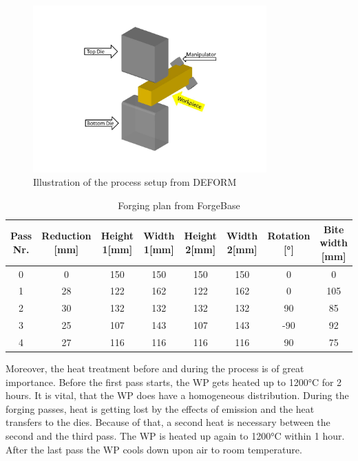 \begin{figure}[!htbp]
 \centering
 \includegraphics[width=0.8\textwidth]{images/processsetup}
 \caption{Illustration of the process setup from DEFORM}
 \label{img:processsetup}
\end{figure}

\begin{table}
 \centering
 \caption{Forging plan from ForgeBase}
 \begin{tabular}{|c|c|c|c|c|c|c|c|}
 Pass Nr.&Reduction [mm]&Height 1[mm]&Width 1[mm]&Height 2[mm]&Width 2[mm]&Rotation [°]&Bite width [mm]\\
 \hline
 0&0&150&150&150&150&0&0\\
 \hline
 1&28&122&162&122&162&0&105\\
 \hline
 2&30&132&132&132&132&90&85\\
 \hline
 3&25&107&143&107&143&-90&92\\
 \hline
 4&27&116&116&116&116&90&75\\
 \hline
 \end{tabular}
\end{table}\par

Moreover, the heat treatment before and during the process is of great importance. Before the first pass starts, the WP gets heated up to 1200°C for 2 hours. It is vital, that the WP does have a homogeneous distribution. During the forging passes, heat is getting lost by the effects of emission and the heat transfers to the dies. Because of that, a second heat is necessary between the second and the third pass. The WP is heated up again to 1200°C within 1 hour. After the last pass the WP cools down upon air to room temperature.
